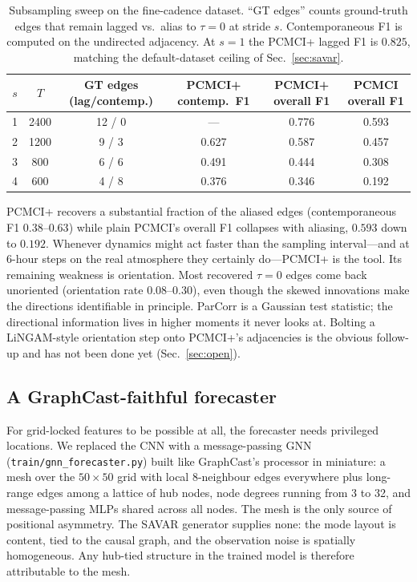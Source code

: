 \begin{table}[h]
\centering
\small
\begin{tabular}{cccccc}
\toprule
$s$ & $T$ & GT edges (lag/contemp.) & PCMCI+ contemp.\ F1 & PCMCI+ overall F1 &
PCMCI overall F1 \\
\midrule
1 & 2400 & 12 / 0 & ---   & 0.776 & 0.593 \\
2 & 1200 &  9 / 3 & 0.627 & 0.587 & 0.457 \\
3 &  800 &  6 / 6 & 0.491 & 0.444 & 0.308 \\
4 &  600 &  4 / 8 & 0.376 & 0.346 & 0.192 \\
\bottomrule
\end{tabular}
\caption{Subsampling sweep on the fine-cadence dataset. ``GT edges'' counts
ground-truth edges that remain lagged vs.\ alias to $\tau=0$ at stride $s$.
Contemporaneous F1 is computed on the undirected adjacency. At $s=1$ the PCMCI+
lagged F1 is $0.825$, matching the default-dataset ceiling of
Sec.~\ref{sec:savar}.}
\label{tab:subsample}
\end{table}

PCMCI+ recovers a substantial fraction of the aliased edges (contemporaneous F1
$0.38$--$0.63$) while plain PCMCI's overall F1 collapses with aliasing, $0.593$
down to $0.192$. Whenever dynamics might act faster than the sampling
interval---and at 6-hour steps on the real atmosphere they certainly do---PCMCI+
is the tool. Its remaining weakness is orientation. Most recovered $\tau=0$ edges
come back unoriented (orientation rate $0.08$--$0.30$), even though the skewed
innovations make the directions identifiable in principle. ParCorr is a Gaussian
test statistic; the directional information lives in higher moments it never
looks at. Bolting a LiNGAM-style orientation step onto PCMCI+'s adjacencies is
the obvious follow-up and has not been done yet (Sec.~\ref{sec:open}).

\subsection{A GraphCast-faithful forecaster}
\label{sec:gnn}

For grid-locked features to be possible at all, the forecaster needs privileged
locations. We replaced the CNN with a message-passing GNN
(\texttt{train/gnn\_forecaster.py}) built like GraphCast's processor in miniature:
a mesh over the $50\times50$ grid with local 8-neighbour edges everywhere plus
long-range edges among a lattice of hub nodes, node degrees running from 3 to 32,
and message-passing MLPs shared across all nodes. The mesh is the only source of
positional asymmetry. The SAVAR generator supplies none: the mode layout is
content, tied to the causal graph, and the observation noise is spatially
homogeneous. Any hub-tied structure in the trained model is therefore attributable
to the mesh.

